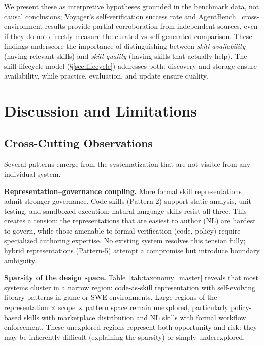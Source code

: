 \documentclass[conference, compsoc]{IEEEtran}
\theoremstyle{plain}
\newcommand{\para}[1]{\smallskip\noindent\textbf{#1.}}
\begin{document}
{We present these as interpretive hypotheses grounded in the benchmark data, not causal conclusions; Voyager's self-verification success rate and AgentBench~\cite{liu2023agentbench} cross-environment results provide partial corroboration from independent sources, even if they do not directly measure the curated-vs-self-generated comparison. These findings underscore the importance of distinguishing between \emph{skill availability} (having relevant skills) and \emph{skill quality} (having skills that actually help). The skill lifecycle model (\S\ref{sec:lifecycle}) addresses both: discovery and storage ensure availability, while practice, evaluation, and update ensure quality.

\section{Discussion and Limitations}
\label{sec:discussion}

\subsection{Cross-Cutting Observations}
\label{sec:discussion:crosscutting}

Several patterns emerge from the systematization that are not visible from any individual system.

\para{Representation--governance coupling} More formal skill representations admit stronger governance. Code skills (Pattern-2) support static analysis, unit testing, and sandboxed execution; natural-language skills resist all three. This creates a tension: the representations that are easiest to author (NL) are hardest to govern, while those amenable to formal verification (code, policy) require specialized authoring expertise. No existing system resolves this tension fully; hybrid representations (Pattern-5) attempt a compromise but introduce boundary ambiguity.

\para{Sparsity of the design space} Table~\ref{tab:taxonomy_master} reveals that most systems cluster in a narrow region: code-as-skill representation with self-evolving library patterns in game or SWE environments. Large regions of the representation $\times$ scope $\times$ pattern space remain unexplored, particularly policy-based skills with marketplace distribution and NL skills with formal workflow enforcement. These unexplored regions represent both opportunity and risk: they may be inherently difficult (explaining the sparsity) or simply underexplored.

}
\end{document}

